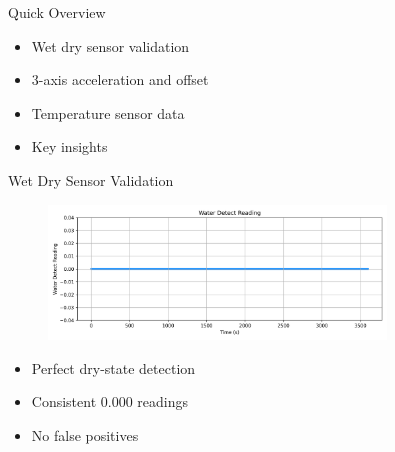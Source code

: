 \begin{frame}{Quick Overview}
    \begin{itemize}
        \item Wet dry sensor validation
        \item 3-axis acceleration and offset
        \item Temperature sensor data
        \item Key insights
    \end{itemize}
\end{frame}


\begin{frame}{Wet Dry Sensor Validation}
    \begin{figure}
        \centering
        \includegraphics[height=1.1\textheight,width=0.8\textwidth,keepaspectratio]{images/water_detect.png}
    \end{figure}
        \begin{itemize} 
            \item Perfect dry-state detection
            \item Consistent 0.000 readings
            \item No false positives
        \end{itemize}
\end{frame}

